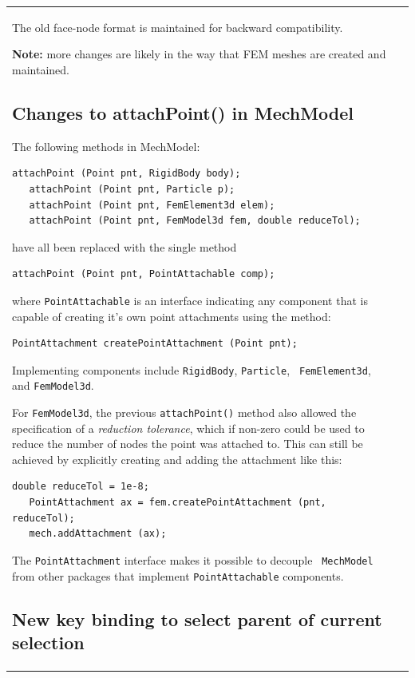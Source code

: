 \documentclass{article}
\begin{document}
\begin{tabular}{ll}
The old face-node format is maintained for backward compatibility.

\begin{sideblock}
{\bf Note:} more changes are likely in the way that FEM meshes 
are created and maintained.
\end{sideblock}

\subsection*{Changes to attachPoint() in MechModel}

The following methods in MechModel:
%
\begin{lstlisting}[]
   attachPoint (Point pnt, RigidBody body);
   attachPoint (Point pnt, Particle p);
   attachPoint (Point pnt, FemElement3d elem);
   attachPoint (Point pnt, FemModel3d fem, double reduceTol);
\end{lstlisting}
%
have all been replaced with the single method
\begin{lstlisting}[]
   attachPoint (Point pnt, PointAttachable comp);
\end{lstlisting}
where {\tt PointAttachable} is an interface indicating any component
that is capable of creating it's own point attachments
using the method:
\begin{lstlisting}[]
   PointAttachment createPointAttachment (Point pnt);
\end{lstlisting}
Implementing components include {\tt RigidBody}, {\tt Particle}, {\tt
FemElement3d}, and {\tt FemModel3d}.  

For {\tt FemModel3d}, the previous {\tt attachPoint()} method also
allowed the specification of a {\it reduction tolerance}, which if
non-zero could be used to reduce the number of nodes the point was
attached to. This can still be achieved by explicitly creating and
adding the attachment like this:
%
\begin{lstlisting}[]
   double reduceTol = 1e-8;
   PointAttachment ax = fem.createPointAttachment (pnt, reduceTol);
   mech.addAttachment (ax);
\end{lstlisting}
%

The {\tt PointAttachment} interface makes it possible to decouple {\tt
MechModel} from other packages that implement {\tt PointAttachable}
components. 

\subsection*{New key binding to select parent of current selection}


\end{tabular}
\end{document}
